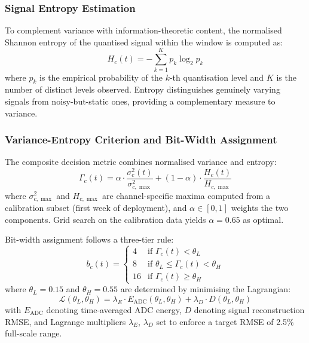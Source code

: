 \subsubsection{Signal Entropy Estimation}

To complement variance with information-theoretic content, the normalised Shannon entropy of the quantised signal within the window is computed as:
\begin{equation}
    H_c(t) = -\sum_{k=1}^{K} p_k \log_2 p_k
    \label{eq:entropy}
\end{equation}
where $p_k$ is the empirical probability of the $k$-th quantisation level and $K$ is the number of distinct levels observed. Entropy distinguishes genuinely varying signals from noisy-but-static ones, providing a complementary measure to variance.

\subsubsection{Variance-Entropy Criterion and Bit-Width Assignment}

The composite decision metric combines normalised variance and entropy:
\begin{equation}
    \Gamma_c(t) = \alpha \cdot \frac{\sigma_c^2(t)}{\sigma_{c,\max}^2} + (1 - \alpha) \cdot \frac{H_c(t)}{H_{c,\max}}
    \label{eq:gamma}
\end{equation}
where $\sigma_{c,\max}^2$ and $H_{c,\max}$ are channel-specific maxima computed from a calibration subset (first week of deployment), and $\alpha \in [0, 1]$ weights the two components. Grid search on the calibration data yields $\alpha = 0.65$ as optimal.

Bit-width assignment follows a three-tier rule:
\begin{equation}
    b_c(t) = \begin{cases}
        4 & \text{if } \Gamma_c(t) < \theta_L \\
        8 & \text{if } \theta_L \leq \Gamma_c(t) < \theta_H \\
        16 & \text{if } \Gamma_c(t) \geq \theta_H
    \end{cases}
    \label{eq:bitwidth}
\end{equation}
where $\theta_L = 0.15$ and $\theta_H = 0.55$ are determined by minimising the Lagrangian:
\begin{equation}
    \mathcal{L}(\theta_L, \theta_H) = \lambda_E \cdot E_{\text{ADC}}(\theta_L, \theta_H) + \lambda_D \cdot D(\theta_L, \theta_H)
    \label{eq:lagrangian}
\end{equation}
with $E_{\text{ADC}}$ denoting time-averaged ADC energy, $D$ denoting signal reconstruction RMSE, and Lagrange multipliers $\lambda_E$, $\lambda_D$ set to enforce a target RMSE of 2.5\% full-scale range.

